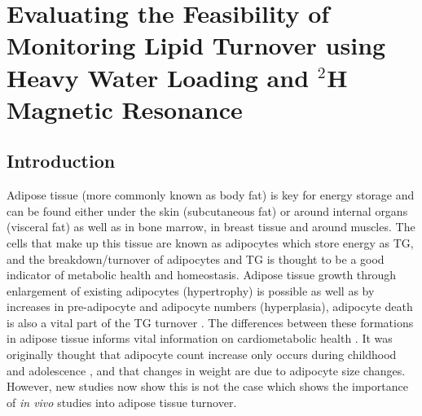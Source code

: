 \chapter{Evaluating the Feasibility of Monitoring Lipid Turnover using Heavy Water Loading and $^2$H Magnetic Resonance}
\label{Chap:Lipid}

\section{Introduction}

Adipose tissue (more commonly known as body fat) is key for energy storage and can be found either under the skin (subcutaneous fat) or around internal organs (visceral fat) as well as in bone marrow, in breast tissue and around muscles. The cells that make up this tissue are known as adipocytes which store energy as \ac{TG}, and the breakdown/turnover of adipocytes and \ac{TG} is thought to be a good indicator of metabolic health and homeostasis. Adipose tissue growth through enlargement of existing adipocytes (hypertrophy) is possible as well as by increases in pre-adipocyte and adipocyte numbers (hyperplasia), adipocyte death is also a vital part of the \ac{TG} turnover \cite{White2019DynamicsDisease}. The differences between these formations in adipose tissue informs vital information on cardiometabolic health \cite{Carnethon2002Serum19871998}. It was originally thought that adipocyte count increase only occurs during childhood and adolescence \cite{Salans1973StudiesPatients}, and that changes in weight are due to adipocyte size changes. However, new studies now show this is not the case \cite{White2016DifferencesWomen} which shows the importance of \textit{in vivo} studies into adipose tissue turnover.


